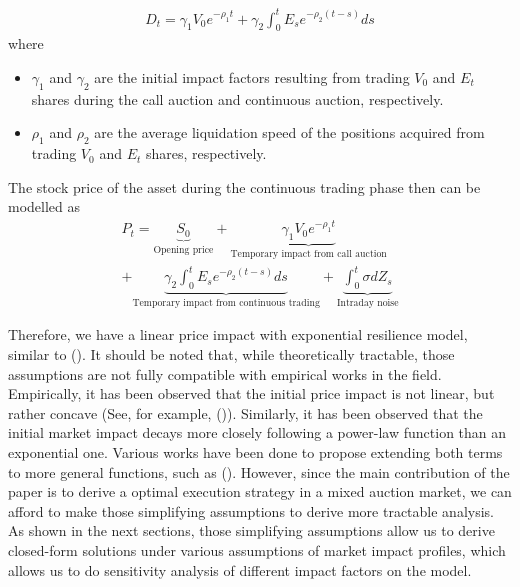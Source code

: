 \documentclass{article}
\begin{document}
\begin{equation}\label{resilence_eqn}
\begin{split}
D_t =\gamma_1 V_0 e^{-\rho_1 t} + \gamma_2 \int_0^t E_s e^{-\rho_2 (t-s)} ds
\end{split}
\end{equation}
where
\begin{itemize}
\item $\gamma_1$ and $\gamma_2$ are the initial impact factors resulting from trading $V_0$ and $E_t$ shares during the call auction and continuous auction, respectively.
\item $\rho_1$ and $\rho_2$ are the average liquidation speed of the positions acquired from trading $V_0$ and $E_t$ shares, respectively.
\end{itemize}
The stock price of the asset during the continuous trading phase then can be modelled as
\begin{equation}\label{resilence_eqn}
\begin{split}
P_t = \underbrace{S_0}_{\text{Opening price}} + \underbrace{\gamma_1 V_0 e^{-\rho_1 t}}_{\text{Temporary impact from call auction}} \\+ \underbrace{\gamma_2 \int_0^t E_s e^{-\rho_2 (t-s)} ds}_{\text{Temporary impact from continuous trading}} +  \underbrace{\int_0^t \sigma dZ_s}_{\text{Intraday noise}}
\end{split}
\end{equation}

Therefore, we have a linear price impact with exponential resilience model, similar to (\cite{Obizhaeva2013}). It should be noted that, while theoretically tractable, those assumptions are not fully compatible with empirical works in the field. Empirically, it has been observed that the initial price impact is not linear, but rather concave (See, for example, (\cite{Eisler2009})). Similarly, it has been observed that the initial market impact decays more closely following a power-law function than an exponential one. Various works have been done to propose extending both terms to more general functions, such as (\cite{Alfonsi2010}). However, since the main contribution of the paper is to derive a optimal execution strategy in a mixed auction market, we can afford to make those simplifying assumptions to derive more tractable analysis. As shown in the next sections, those simplifying assumptions allow us to derive closed-form solutions under various assumptions of market impact profiles, which allows us to do sensitivity analysis of different impact factors on the model.
\end{document}
